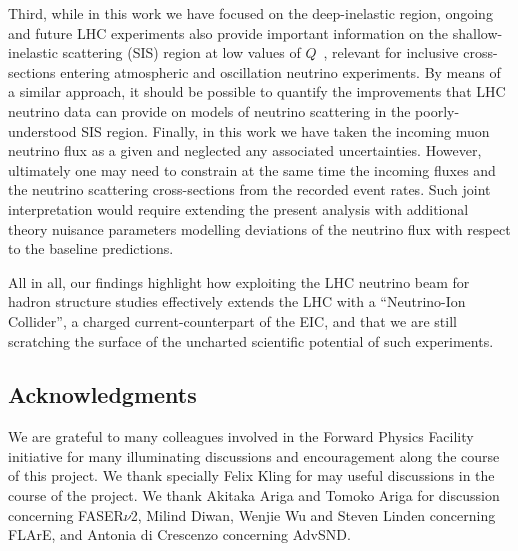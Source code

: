 Third, while in this work we have focused on the deep-inelastic
region, ongoing and future LHC experiments also provide
important information on the shallow-inelastic scattering (SIS)
region at low values of $Q$~\cite{Candido:2023utz}, relevant for inclusive cross-sections
entering atmospheric and oscillation neutrino experiments.
%
By means of a similar approach, it should be possible to quantify
the improvements that LHC neutrino data can provide on models
of neutrino scattering in the poorly-understood SIS region.
%
Finally, in this work we have taken the incoming muon neutrino flux
as a given and neglected any associated uncertainties.
%
However, ultimately one may need to constrain at the same time
the incoming fluxes and the neutrino scattering cross-sections
from the recorded event rates.
%
Such joint interpretation would require extending the present
analysis with additional theory nuisance parameters modelling
deviations of the neutrino flux with respect to the baseline predictions.

All in all, our findings highlight how exploiting
the LHC neutrino beam for hadron structure studies effectively
extends the LHC with a ``Neutrino-Ion Collider'', a charged
current-counterpart of the EIC, and that we are still
scratching the surface of the uncharted
scientific potential of such experiments.

\subsection*{Acknowledgments}
%
We are grateful to many colleagues involved in the Forward
Physics Facility initiative for many illuminating
discussions and encouragement along the course of this project.
%
We thank specially Felix Kling for may useful discussions in the course
of the project.
%
We thank Akitaka Ariga and Tomoko Ariga for discussion
concerning FASER$\nu$2, Milind Diwan,
Wenjie Wu and Steven Linden concerning FLArE,
and Antonia di Crescenzo concerning AdvSND.
